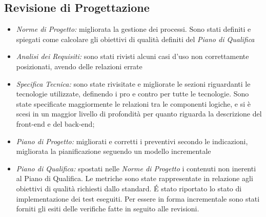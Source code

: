 \subsection{Revisione di Progettazione}
\begin{itemize}
\item \emph{Norme di Progetto: }migliorata la gestione dei processi. Sono stati definiti e spiegati come calcolare gli obiettivi di qualità definiti del \emph{Piano di Qualifica}

\item \emph{Analisi dei Requisiti: }sono stati rivisti alcuni casi d'uso non correttamente posizionati, avendo delle relazioni errate

\item \emph{Specifica Tecnica: }sono state rivisitate e migliorate le sezioni riguardanti le tecnologie utilizzate, definendo i pro e contro per tutte le tecnologie. Sono state specificate maggiormente le relazioni tra le componenti logiche, e si è scesi in un maggior livello di profondità per quanto riguarda la descrizione del front-end e del back-end;

\item \emph{Piano di Progetto: }migliorati e corretti i preventivi secondo le indicazioni, migliorata la pianificazione seguendo un modello incrementale

\item \emph{Piano di Qualifica: }spostati nelle \emph{Norme di Progetto} i contenuti non inerenti al Piano di Qualifica. Le metriche sono state rappresentate in relazione agli obiettivi di qualità richiesti dallo standard. É stato riportato lo stato di implementazione dei test eseguiti. Per essere in forma incrementale sono stati forniti gli esiti delle verifiche fatte in seguito alle revisioni.
\end{itemize}


